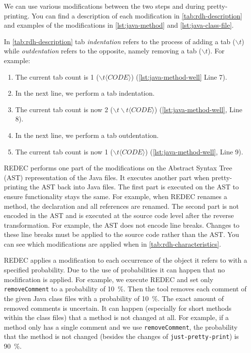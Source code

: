 \documentclass[%
class=scrreprt,
chapterprefix=false,%
open=right,%
twoside=true,%
paper=a4,%
logofile={Logo\_zentral\_farbig\_EN.png},%
thesistype=master,%
UKenglish,%
]{se2thesis}
\theoremstyle{definition}
\newcommand{\rdh}{REDEC\xspace}
\newcommand{\none}{just-pretty-print\xspace} %
\newcommand{\nonet}{\texttt{\none}\xspace} %
\begin{document}
	We can use various modifications between the two steps and during pretty-printing. You can find a description of each modification in \autoref{tab:rdh-description} and examples of the modifications in \autoref{lst:java-method} and \autoref{lst:java-class-file}.
	
	\pagebreak
	
	In \autoref{tab:rdh-description} tab \textit{indentation} refers to the process of adding a tab ($\backslash t$) while \textit{outdentation} refers to the opposite, namely removing a tab ($\backslash t$). 
	For example:
	\begin{enumerate}
		\item The current tab count is 1 ($\backslash t \langle CODE \rangle$) (\autoref{lst:java-method-well} Line 7).
		\item In the next line, we perform a tab indentation.
		\item The current tab count is now 2 ($\backslash t \backslash t \langle CODE \rangle $) (\autoref{lst:java-method-well}, Line 8).
		\item In the next line, we perform a tab outdentation.
		\item The current tab count is now 1 ($\backslash t \langle CODE \rangle $) (\autoref{lst:java-method-well}, Line 9).
	\end{enumerate}
		
	\rdh performs one part of the modifications on the Abstract Syntax Tree (AST) representation of the Java files. It executes another part when pretty-printing the AST back into Java files. The first part is executed on the AST to ensure functionality stays the same. For example, when REDEC renames a method, the declaration and all references are renamed.
	The second part is not encoded in the AST and is executed at the source code level after the reverse transformation. For example, the AST does not encode line breaks. Changes to these line breaks must be applied to the source code rather than the AST. You can see which modifications are applied when in \autoref{tab:rdh-characteristics}.
	
	\rdh applies a modification to each occurrence of the object it refers to with a specified probability. Due to the use of probabilities it can happen that no modification is applied. For example, we execute \rdh and set only \texttt{removeComment} to a probability of 10~\%. Then the tool removes each comment of the given Java class files with a probability of 10~\%. The exact amount of removed comments is uncertain. It can happen (especially for short methods within the class files) that a method is not changed at all. For example, if a method only has a single comment and we use \texttt{removeComment}, the probability that the method is not changed (besides the changes of \nonet) is 90~\%.
	
\end{document}
